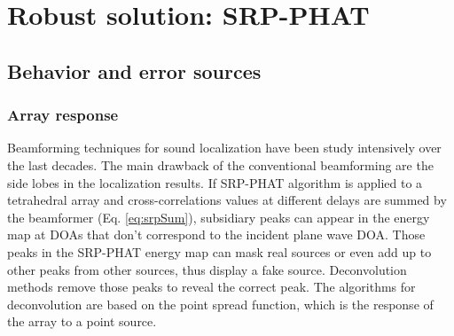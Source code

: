 \section{Robust solution: SRP-PHAT}
\subsection{Behavior and error sources}
\subsubsection{Array response}
Beamforming techniques for sound localization have been study intensively over the last decades. The main drawback of the conventional beamforming are the side lobes in the localization results. If SRP-PHAT algorithm is applied to a tetrahedral array and cross-correlations values at different delays are summed by the beamformer (Eq. \ref{eq:srpSum}), subsidiary peaks can appear in the energy map at DOAs that don't correspond to the incident plane wave DOA. Those peaks in the SRP-PHAT energy map can mask real sources or even add up to other peaks from other sources, thus display a fake source. Deconvolution methods remove those peaks to reveal the correct peak. The algorithms for deconvolution are based on the point spread function, which is the response of the array to a point source. 
